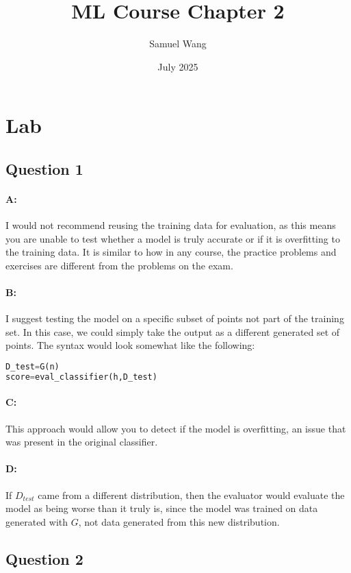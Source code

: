 \documentclass{article}
\title{ML Course Chapter 2}
\author{Samuel Wang}
\date{July 2025}
\begin{document}
\maketitle

\section{Lab}

\subsection{Question 1}

\paragraph{A: } I would not recommend reusing the training data for evaluation, as this means you are unable to test whether a model is truly accurate or if it is overfitting to the training data. It is similar to how in any course, the practice problems and exercises are different from the problems on the exam.

\paragraph{B: } I suggest testing the model on a specific subset of points not part of the training set. In this case, we could simply take the output as a different generated set of points. The syntax would look somewhat like the following:
\begin{lstlisting}[language=Python]
D_test=G(n)
score=eval_classifier(h,D_test)
\end{lstlisting}

\paragraph{C: } This approach would allow you to detect if the model is overfitting, an issue that was present in the original classifier.

\paragraph{D: } If $D_{test}$ came from a different distribution, then the evaluator would evaluate the model as being worse than it truly is, since the model was trained on data generated with $G$, not data generated from this new distribution.

\subsection{Question 2}
\end{document}
